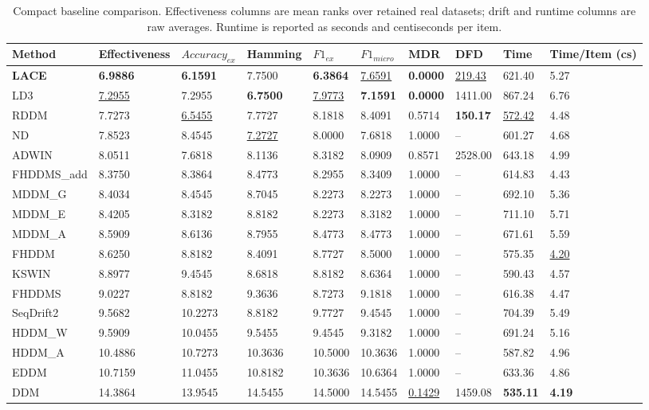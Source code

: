 \begin{table}
\caption{Compact baseline comparison. Effectiveness columns are mean ranks over retained real datasets; drift and runtime columns are raw averages. Runtime is reported as seconds and centiseconds per item.}
\label{tab:baseline_compact_final}
\begin{tabular}{llllllllll}
\toprule
Method & Effectiveness & $Accuracy_{ex}$ & Hamming & $F1_{ex}$ & $F1_{micro}$ & MDR & DFD & Time & Time/Item (cs) \\
\midrule
\textbf{LACE} & \textbf{6.9886} & \textbf{6.1591} & 7.7500 & \textbf{6.3864} & \underline{7.6591} & \textbf{0.0000} & \underline{219.43} & 621.40 & 5.27 \\
LD3 & \underline{7.2955} & 7.2955 & \textbf{6.7500} & \underline{7.9773} & \textbf{7.1591} & \textbf{0.0000} & 1411.00 & 867.24 & 6.76 \\
RDDM & 7.7273 & \underline{6.5455} & 7.7727 & 8.1818 & 8.4091 & 0.5714 & \textbf{150.17} & \underline{572.42} & 4.48 \\
ND & 7.8523 & 8.4545 & \underline{7.2727} & 8.0000 & 7.6818 & 1.0000 & -- & 601.27 & 4.68 \\
ADWIN & 8.0511 & 7.6818 & 8.1136 & 8.3182 & 8.0909 & 0.8571 & 2528.00 & 643.18 & 4.99 \\
FHDDMS\_add & 8.3750 & 8.3864 & 8.4773 & 8.2955 & 8.3409 & 1.0000 & -- & 614.83 & 4.43 \\
MDDM\_G & 8.4034 & 8.4545 & 8.7045 & 8.2273 & 8.2273 & 1.0000 & -- & 692.10 & 5.36 \\
MDDM\_E & 8.4205 & 8.3182 & 8.8182 & 8.2273 & 8.3182 & 1.0000 & -- & 711.10 & 5.71 \\
MDDM\_A & 8.5909 & 8.6136 & 8.7955 & 8.4773 & 8.4773 & 1.0000 & -- & 671.61 & 5.59 \\
FHDDM & 8.6250 & 8.8182 & 8.4091 & 8.7727 & 8.5000 & 1.0000 & -- & 575.35 & \underline{4.20} \\
KSWIN & 8.8977 & 9.4545 & 8.6818 & 8.8182 & 8.6364 & 1.0000 & -- & 590.43 & 4.57 \\
FHDDMS & 9.0227 & 8.8182 & 9.3636 & 8.7273 & 9.1818 & 1.0000 & -- & 616.38 & 4.47 \\
SeqDrift2 & 9.5682 & 10.2273 & 8.8182 & 9.7727 & 9.4545 & 1.0000 & -- & 704.39 & 5.49 \\
HDDM\_W & 9.5909 & 10.0455 & 9.5455 & 9.4545 & 9.3182 & 1.0000 & -- & 691.24 & 5.16 \\
HDDM\_A & 10.4886 & 10.7273 & 10.3636 & 10.5000 & 10.3636 & 1.0000 & -- & 587.82 & 4.96 \\
EDDM & 10.7159 & 11.0455 & 10.8182 & 10.3636 & 10.6364 & 1.0000 & -- & 633.36 & 4.86 \\
DDM & 14.3864 & 13.9545 & 14.5455 & 14.5000 & 14.5455 & \underline{0.1429} & 1459.08 & \textbf{535.11} & \textbf{4.19} \\
\bottomrule
\end{tabular}
\end{table}
